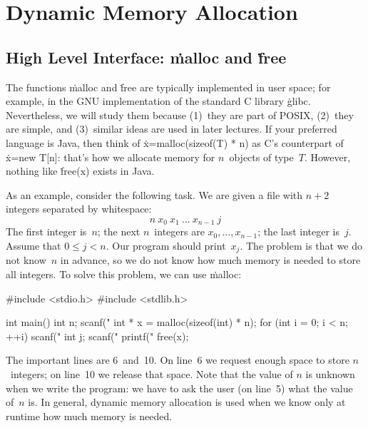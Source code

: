 \chapter{Dynamic Memory Allocation}\label{ch:01-dynamic-memory}


\newcommand\mem[1]{
  \foreach \x in {0,1,...,#1} {
    \draw (\x,0) rectangle (\x+1,1);
  }
}
\newcommand\memnum[1]{
  \foreach \x in {0,1,...,#1} {
    \draw[fill=gray] (\x,0) rectangle node{$\x$} (\x+1,1);
  }
}
\newcommand\memblock[3]{
  \draw[#1,very thick,rounded corners=1pt]
    (#2+0.2,0.2) rectangle (#3-0.2,0.8);
}
\newcommand\use[2]{\memblock{us}{#1}{#2}}
\newcommand\fre[2]{\memblock{fs}{#1}{#2}}
\newcommand\T{\tikz[baseline=2,scale=.4]}

\section{High Level Interface: \.{malloc} and \.{free}}

The functions \.{malloc} and \.{free} are typically implemented in user space;
  for example, in the GNU implementation of the standard C library \.{glibc}.
Nevertheless, we will study them because
  (1)~they are part of POSIX,
  (2)~they are simple, and
  (3)~similar ideas are used in later lectures.
If your preferred language is Java,
  then think of \.{x=malloc(sizeof(T) * n)} as C's counterpart of \.{x=new T[n]}:
  that's how we allocate memory for $n$~objects of type~$T$.
However,
  nothing like \.{free(x)} exists in Java.

As an example, consider the following task.
We are given a file with $n+2$ integers separated by whitespace:
\[
  n\ x_0\ x_1\ \ldots\ x_{n-1}\ j
\]
The first integer is~$n$;
  the next $n$~integers are $x_0,\ldots,x_{n-1}$;
  the last integer is~$j$.
Assume that $0 \le j < n$.
Our program should print~$x_j$.
The problem is that we do not know~$n$ in advance,
  so we do not know how much memory is needed to store all integers.
To solve this problem, we can use \.{malloc}:
\begin{ccode}
#include <stdio.h>
#include <stdlib.h>

int main() {
  int n; scanf("%
  int * x = malloc(sizeof(int) * n);
  for (int i = 0; i < n; ++i) scanf("%
  int j; scanf("%
  printf("%
  free(x);
}
\end{ccode}
The important lines are 6~and~10.
On line~6 we request enough space to store $n$~integers;
  on line~10 we release that space.
Note that the value of $n$ is unknown when we write the program:
  we have to ask the user (on line~5) what the value of~$n$ is.
In general,
  dynamic memory allocation is used when we know only at runtime how much memory is needed.

